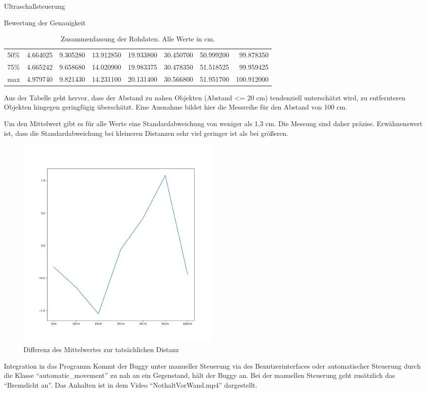 \documentclass[12pt]{report}
\begin{document}
\begin{section}{Ultraschallsteuerung}
\begin{subsection}{Bewertung der Genauigkeit}
\begin{table}[h!]
\begin{tabular}{lrrrrrrr}
          50\%   &    4.664025 &    9.305280 &   13.912850 &   19.933800 &   30.450700 &   50.999200 &   99.878350 \\
          75\%   &    4.665242 &    9.658680 &   14.020900 &   19.983375 &   30.478350 &   51.518525 &   99.959425 \\
          max   &    4.979740 &    9.821430 &   14.231100 &   20.131400 &   30.566800 &   51.951700 &  100.912000 \\
        \end{tabular}
        \caption{Zusammenfassung der Rohdaten. Alle Werte in cm.}
    \end{table}
    Aus der Tabelle geht hervor, dass der Abstand zu nahen
    Objekten (Abstand <= 20 cm) tendenziell unterschätzt wird, zu entfernteren
    Objekten hingegen geringfügig überschätzt. Eine Ausnahme bildet hier die
    Messreihe für den Abstand von 100 cm.
    
    Um den Mittelwert gibt es für alle Werte eine Standardabweichung von weniger
    als 1,3 cm. Die Messung sind daher präzise. Erwähnenswert ist, dass die
    Standardabweichung bei kleineren Distanzen sehr viel geringer ist als bei größeren.

    \begin{figure}[h!]
      \centering
      \includegraphics[width=0.5\textwidth]{test_data_ultrasonic/meanDiff.png}
      \caption{Differenz des Mittelwertes zur tatsächlichen Distanz}
    \end{figure}

  \end{subsection}
  \begin{subsection}{Integration in das Programm}
    Kommt der Buggy unter manueller Steuerung via des Benutzerinterfaces oder
    automatischer Steuerung durch die Klasse ``automatic\_movement'' zu nah
    an ein Gegenstand, hält der Buggy an. Bei der manuellen Steuerung geht zusätzlich
    das ``Bremslicht an''.
    Das Anhalten ist in dem Video ``NothaltVorWand.mp4'' dargestellt.
  \end{subsection}

\end{section}
\end{document}
